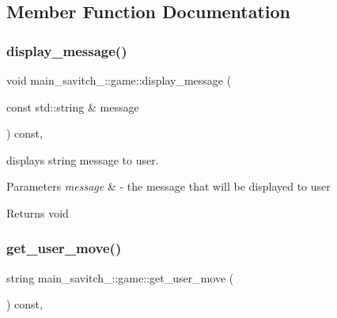 \subsection{Member Function Documentation}
\mbox{\label{classmain__savitch__14_1_1game_ac58bfc07db8e604b07d2039b2cf7ab51}} 
\subsubsection{\texorpdfstring{display\+\_\+message()}{display\_message()}}
{\footnotesize\ttfamily void main\+\_\+savitch\+\_\+::game\+::display\+\_\+message (\begin{DoxyParamCaption}\item[{const std\+::string \&}]{message }\end{DoxyParamCaption}) const\hspace{0.3cm}{\ttfamily [protected]}, {\ttfamily [virtual]}}



displays string message to user. 


\begin{DoxyParams}{Parameters}
{\em message} & -\/ the message that will be displayed to user \\
\hline
\end{DoxyParams}
\begin{DoxyReturn}{Returns}
void 
\end{DoxyReturn}
\mbox{\label{classmain__savitch__14_1_1game_a6504d401fcc8b138ae6342c2868c8a40}} 
\subsubsection{\texorpdfstring{get\+\_\+user\+\_\+move()}{get\_user\_move()}}
{\footnotesize\ttfamily string main\+\_\+savitch\+\_\+::game\+::get\+\_\+user\+\_\+move (\begin{DoxyParamCaption}{ }\end{DoxyParamCaption}) const\hspace{0.3cm}{\ttfamily [protected]}, {\ttfamily [virtual]}}




